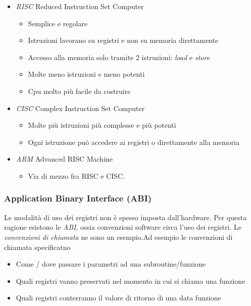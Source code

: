 \begin{itemize}
	\item \textit{RISC} Reduced Instruction Set Computer
	      \begin{itemize}
		      \item Semplice e regolare
		      \item Istruzioni lavorano su registri e non su memoria direttamente
		      \item Accesso alla memoria solo tramite 2 istruzioni: \textit{load} e \textit{store}
		      \item Molte meno istruzioni e meno potenti
		      \item Cpu molto più facile da costruire
	      \end{itemize}
	\item \textit{CISC} Complex Instruction Set Computer
	      \begin{itemize}
		      \item Molte più istruzioni più complesse e più potenti
		      \item Ogni istruzione può accedere ai registri o direttamente alla memoria
	      \end{itemize}
	\item \textit{ARM} Advanced RISC Machine
	      \begin{itemize}
		      \item Via di mezzo fra RISC e CISC.
	      \end{itemize}
\end{itemize}
\subsubsection*{Application Binary Interface (ABI)}
Le modalità di uso dei registri non è spesso imposta dall'hardware. Per questa ragione esistono le \textit{ABI}, ossia convenzioni software circa l'uso dei registri. Le \textit{convenzioni di chiamata} ne sono un esempio.Ad esempio le convenzioni di chiamata specificatno
\begin{itemize}
	\item Come / dove passare i parametri ad una subroutine/funzione
	\item Quali registri vanno preservati nel momento in cui si chiama una funzione
	\item Quali registri conterranno il valore di ritorno di una data funzione
\end{itemize}

